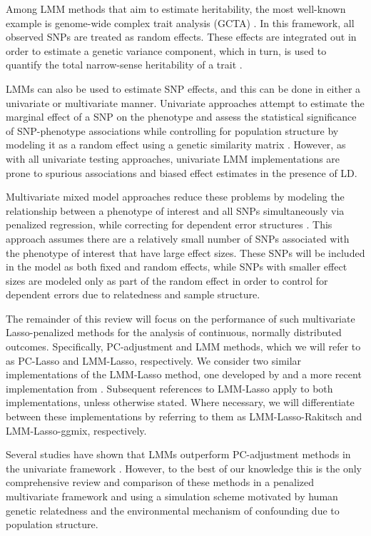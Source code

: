 Among LMM methods that aim to estimate heritability, the most well-known example is genome-wide complex trait analysis (GCTA) \citep{yang2011gcta}. In this framework, all observed SNPs are treated as random effects. These effects are integrated out in order to estimate a genetic variance component, which in turn, is used to quantify the total narrow-sense heritability of a trait \citep{yang2010common}.

LMMs can also be used to estimate SNP effects, and this can be done in either a univariate or multivariate manner. Univariate approaches attempt to estimate the marginal effect of a SNP on the phenotype and assess the statistical significance of SNP-phenotype associations while controlling for population structure by modeling it as a random effect using a genetic similarity matrix \citep{yu2006unified, kang2010variance, kang2008efficient}. However, as with all univariate testing approaches, univariate LMM implementations are prone to spurious associations and biased effect estimates in the presence of LD. 

Multivariate mixed model approaches reduce these problems by modeling the relationship between a phenotype of interest and all SNPs simultaneously via penalized regression, while correcting for dependent error structures  \citep{Rakitsch2012, bhatnagar2019simultaneous}. This approach assumes there are a relatively small number of SNPs associated with the phenotype of interest that have large effect sizes. These SNPs will be included in the model as both fixed and random effects, while SNPs with smaller effect sizes are modeled only as part of the random effect in order to control for dependent errors due to relatedness and sample structure. 

The remainder of this review will focus on the performance of such multivariate Lasso-penalized methods for the analysis of continuous, normally distributed outcomes. Specifically, PC-adjustment and LMM methods, which we will refer to as PC-Lasso and LMM-Lasso, respectively. We consider two similar implementations of the LMM-Lasso method, one developed by \citet{Rakitsch2012} and a more recent implementation from \citet{bhatnagar2019simultaneous}. Subsequent references to LMM-Lasso apply to both implementations, unless otherwise stated. Where necessary, we will differentiate between these implementations by referring to them as LMM-Lasso-Rakitsch and LMM-Lasso-ggmix, respectively. 

Several studies have shown that LMMs outperform PC-adjustment methods in the univariate framework \citep{wang2013analytical, kang2010variance, zhao2007arabidopsis}. However, to the best of our knowledge this is the only comprehensive review and comparison of these methods in a penalized multivariate framework and using a simulation scheme motivated by human genetic relatedness and the environmental mechanism of confounding due to population structure.\\

